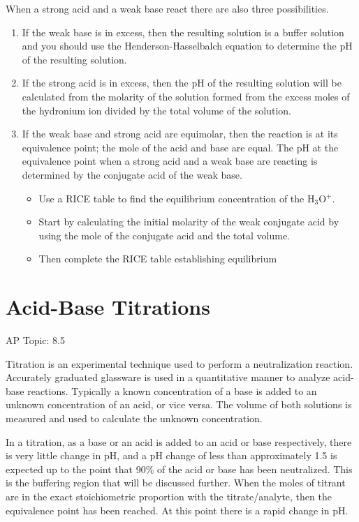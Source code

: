 \documentclass[../chem.tex]{subfiles}
\begin{document}
When a strong acid and a weak base react there are also three possibilities.
\begin{enumerate}
    \item If the weak base is in excess, then the resulting solution is a buffer solution and you should use the Henderson-Hasselbalch equation to determine the pH of the resulting solution.
    \item If the strong acid is in excess, then the pH of the resulting solution will be calculated from the molarity of the solution formed from the excess moles of the hydronium ion divided by the total volume of the solution.
    \item If the weak base and strong acid are equimolar, then the reaction is at its equivalence point; the mole of the acid and base are equal. The pH at the equivalence point when a strong acid and a weak base are reacting is determined by the conjugate acid of the weak base.
    \begin{itemize}
        \item Use a RICE table to find the equilibrium concentration of the H$_3$O$^+$.
        \item Start by calculating the initial molarity of the weak conjugate acid by using the mole of the conjugate acid and the total volume.
        \item Then complete the RICE table establishing equilibrium
    \end{itemize}
\end{enumerate}

\section{Acid-Base Titrations}
AP Topic: 8.5

Titration is an experimental technique used to perform a neutralization reaction. Accurately graduated glassware is used in a quantitative
manner to analyze acid-base reactions. Typically a known concentration of a base is added to an unknown concentration of an acid, or vice versa.
The volume of both solutions is measured and used to calculate the unknown concentration.

In a titration, as a base or an acid is added to an acid or base respectively, there is very little change in pH, and a pH change of less than 
approximately 1.5 is expected up to the point that 90\% of the acid or base has been neutralized. This is the buffering region that will be discussed further.
When the moles of titrant are in the exact stoichiometric proportion with the titrate/analyte, then the equivalence point has been reached. At this point there is a rapid change in pH.
\end{document}
